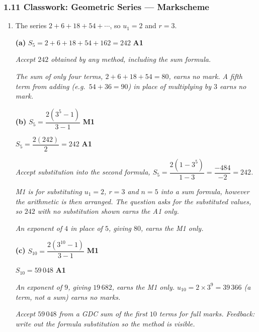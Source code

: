 \documentclass[12pt, twoside]{article}
\begin{document}
\subsubsection*{1.11 Classwork: Geometric Series --- Markscheme}

\begin{enumerate}[itemsep=0.3cm]

\item[1.] [Maximum mark: 7]

The series $2 + 6 + 18 + 54 + \cdots$, so $u_{1} = 2$ and $r = 3$.

\medskip

\textbf{(a)} $S_{5} = 2 + 6 + 18 + 54 + 162 = 242$ \hfill \textbf{A1}

\emph{Accept $242$ obtained by any method, including the sum formula.}

\emph{The sum of only four terms, $2 + 6 + 18 + 54 = 80$, earns no mark.
A fifth term from adding (e.g.\ $54 + 36 = 90$) in place of multiplying by
$3$ earns no mark.}

\medskip

\textbf{(b)} $S_{5} = \dfrac{2\left(3^{5} - 1\right)}{3 - 1}$ \hfill \textbf{M1}

$S_{5} = \dfrac{2(242)}{2} = 242$ \hfill \textbf{A1}

\emph{Accept substitution into the second formula,
$S_{5} = \dfrac{2\left(1 - 3^{5}\right)}{1 - 3} = \dfrac{-484}{-2} = 242$.}

\emph{M1 is for substituting $u_{1} = 2$, $r = 3$ and $n = 5$ into a sum
formula, however the arithmetic is then arranged. The question asks for
the substituted values, so $242$ with no substitution shown earns the A1
only.}

\emph{An exponent of $4$ in place of $5$, giving $80$, earns the M1 only.}

\medskip

\textbf{(c)} $S_{10} = \dfrac{2\left(3^{10} - 1\right)}{3 - 1}$ \hfill \textbf{M1}

$S_{10} = 59\,048$ \hfill \textbf{A1}

\emph{An exponent of $9$, giving $19\,682$, earns the M1 only.
$u_{10} = 2 \times 3^{9} = 39\,366$ (a term, not a sum) earns no marks.}

\emph{Accept $59\,048$ from a GDC sum of the first $10$ terms for full
marks. Feedback: write out the formula substitution so the method is
visible.}

\medskip


\end{enumerate}
\end{document}
